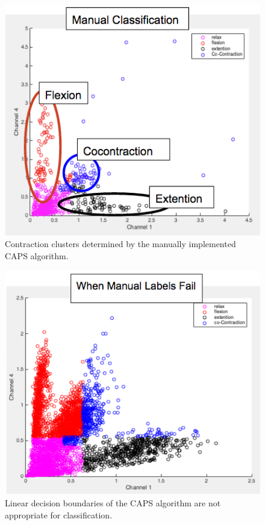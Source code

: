 \documentclass[times, 10pt,twocolumn]{article}
\begin{document}
\begin{figure}[h]
  \includegraphics[width=\linewidth]{Figures/f4.png}
  \caption{Contraction clusters determined by the manually implemented CAPS algorithm.}
  \label{manual_clusters}
\end{figure}

\begin{figure}[h]
  \includegraphics[width=\linewidth]{Figures/f5.png}
  \caption{Linear decision boundaries of the CAPS algorithm are not appropriate for classification.}
  \label{manual_clusters_fail}
\end{figure}
\end{document}
